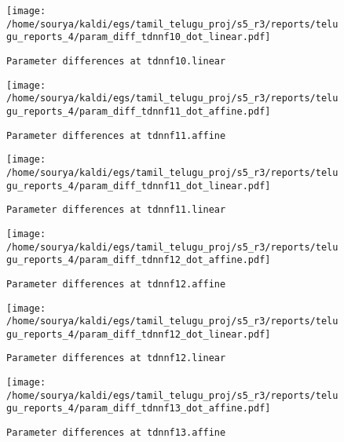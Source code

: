 \documentclass[prl,10pt,twocolumn]{revtex4}
\begin{document}
\newpage
\begin{figure}[h]
  \begin{center}
    \caption{\texttt{Parameter differences at tdnnf10.linear}}
    \texttt{[image: /home/sourya/kaldi/egs/tamil\_telugu\_proj/s5\_r3/reports/telugu\_reports\_4/param\_diff\_tdnnf10\_dot\_linear.pdf]}
  \end{center}
\end{figure}
\clearpage


\newpage
\begin{figure}[h]
  \begin{center}
    \caption{\texttt{Parameter differences at tdnnf11.affine}}
    \texttt{[image: /home/sourya/kaldi/egs/tamil\_telugu\_proj/s5\_r3/reports/telugu\_reports\_4/param\_diff\_tdnnf11\_dot\_affine.pdf]}
  \end{center}
\end{figure}
\clearpage


\newpage
\begin{figure}[h]
  \begin{center}
    \caption{\texttt{Parameter differences at tdnnf11.linear}}
    \texttt{[image: /home/sourya/kaldi/egs/tamil\_telugu\_proj/s5\_r3/reports/telugu\_reports\_4/param\_diff\_tdnnf11\_dot\_linear.pdf]}
  \end{center}
\end{figure}
\clearpage


\newpage
\begin{figure}[h]
  \begin{center}
    \caption{\texttt{Parameter differences at tdnnf12.affine}}
    \texttt{[image: /home/sourya/kaldi/egs/tamil\_telugu\_proj/s5\_r3/reports/telugu\_reports\_4/param\_diff\_tdnnf12\_dot\_affine.pdf]}
  \end{center}
\end{figure}
\clearpage


\newpage
\begin{figure}[h]
  \begin{center}
    \caption{\texttt{Parameter differences at tdnnf12.linear}}
    \texttt{[image: /home/sourya/kaldi/egs/tamil\_telugu\_proj/s5\_r3/reports/telugu\_reports\_4/param\_diff\_tdnnf12\_dot\_linear.pdf]}
  \end{center}
\end{figure}
\clearpage


\newpage
\begin{figure}[h]
  \begin{center}
    \caption{\texttt{Parameter differences at tdnnf13.affine}}
    \texttt{[image: /home/sourya/kaldi/egs/tamil\_telugu\_proj/s5\_r3/reports/telugu\_reports\_4/param\_diff\_tdnnf13\_dot\_affine.pdf]}
  \end{center}
\end{figure}
\clearpage
\end{document}
